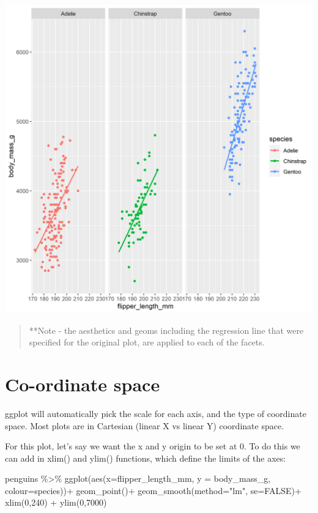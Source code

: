 \documentclass[
]{book}
\newenvironment{Shaded}{\begin{snugshade}}{\end{snugshade}}
\newcommand{\AttributeTok}[1]{\textcolor[rgb]{0.77,0.63,0.00}{#1}}
\newcommand{\ConstantTok}[1]{\textcolor[rgb]{0.00,0.00,0.00}{#1}}
\newcommand{\DecValTok}[1]{\textcolor[rgb]{0.00,0.00,0.81}{#1}}
\newcommand{\FunctionTok}[1]{\textcolor[rgb]{0.00,0.00,0.00}{#1}}
\newcommand{\NormalTok}[1]{#1}
\newcommand{\SpecialCharTok}[1]{\textcolor[rgb]{0.00,0.00,0.00}{#1}}
\newcommand{\StringTok}[1]{\textcolor[rgb]{0.31,0.60,0.02}{#1}}
\begin{document}
\includegraphics[width=0.8\linewidth]{images/facet}

\begin{quote}
**Note - the aesthetics and geoms including the regression line that were specified for the original plot, are applied to each of the facets.
\end{quote}

\hypertarget{co-ordinate-space}{%
\section{Co-ordinate space}\label{co-ordinate-space}}

ggplot will automatically pick the scale for each axis, and the type of coordinate space. Most plots are in Cartesian (linear X vs linear Y) coordinate space.

For this plot, let's say we want the x and y origin to be set at 0. To do this we can add in xlim() and ylim() functions, which define the limits of the axes:

\begin{Shaded}
\begin{Highlighting}[]
\NormalTok{penguins }\SpecialCharTok{\%\textgreater{}\%} 
  \FunctionTok{ggplot}\NormalTok{(}\FunctionTok{aes}\NormalTok{(}\AttributeTok{x=}\NormalTok{flipper\_length\_mm, }
             \AttributeTok{y =}\NormalTok{ body\_mass\_g,}
             \AttributeTok{colour=}\NormalTok{species))}\SpecialCharTok{+} 
  \FunctionTok{geom\_point}\NormalTok{()}\SpecialCharTok{+}
  \FunctionTok{geom\_smooth}\NormalTok{(}\AttributeTok{method=}\StringTok{"lm"}\NormalTok{,    }
              \AttributeTok{se=}\ConstantTok{FALSE}\NormalTok{)}\SpecialCharTok{+}
  \FunctionTok{xlim}\NormalTok{(}\DecValTok{0}\NormalTok{,}\DecValTok{240}\NormalTok{) }\SpecialCharTok{+} \FunctionTok{ylim}\NormalTok{(}\DecValTok{0}\NormalTok{,}\DecValTok{7000}\NormalTok{)}
\end{Highlighting}
\end{Shaded}
\end{document}
